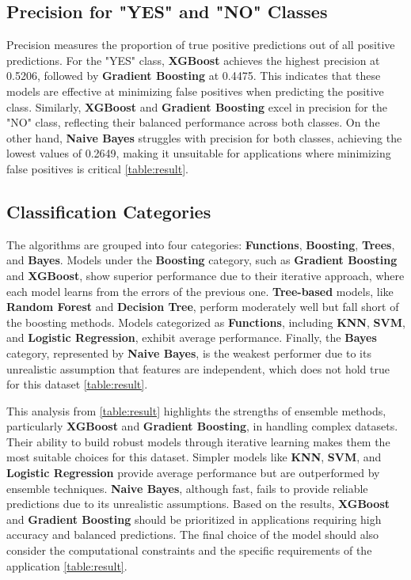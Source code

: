 \documentclass[pdflatex,sn-nature,Numbered]{sn-jnl}%
\theoremstyle{thmstyleone}%
\theoremstyle{thmstyletwo}%
\theoremstyle{thmstylethree}%
\begin{document}
\subsection{Precision for "YES" and "NO" Classes}
Precision measures the proportion of true positive predictions out of all positive predictions. For the "YES" class, \textbf{XGBoost} achieves the highest precision at 0.5206, followed by \textbf{Gradient Boosting} at 0.4475. This indicates that these models are effective at minimizing false positives when predicting the positive class. Similarly, \textbf{XGBoost} and \textbf{Gradient Boosting} excel in precision for the "NO" class, reflecting their balanced performance across both classes. On the other hand, \textbf{Naive Bayes} struggles with precision for both classes, achieving the lowest values of 0.2649, making it unsuitable for applications where minimizing false positives is critical \autoref{table:result}.

\subsection{Classification Categories}
The algorithms are grouped into four categories: \textbf{Functions}, \textbf{Boosting}, \textbf{Trees}, and \textbf{Bayes}. Models under the \textbf{Boosting} category, such as \textbf{Gradient Boosting} and \textbf{XGBoost}, show superior performance due to their iterative approach, where each model learns from the errors of the previous one. \textbf{Tree-based} models, like \textbf{Random Forest} and \textbf{Decision Tree}, perform moderately well but fall short of the boosting methods. Models categorized as \textbf{Functions}, including \textbf{KNN}, \textbf{SVM}, and \textbf{Logistic Regression}, exhibit average performance. Finally, the \textbf{Bayes} category, represented by \textbf{Naive Bayes}, is the weakest performer due to its unrealistic assumption that features are independent, which does not hold true for this dataset \autoref{table:result}.



This analysis from \autoref{table:result} highlights the strengths of ensemble methods, particularly \textbf{XGBoost} and \textbf{Gradient Boosting}, in handling complex datasets. Their ability to build robust models through iterative learning makes them the most suitable choices for this dataset. Simpler models like \textbf{KNN}, \textbf{SVM}, and \textbf{Logistic Regression} provide average performance but are outperformed by ensemble techniques. \textbf{Naive Bayes}, although fast, fails to provide reliable predictions due to its unrealistic assumptions. Based on the results, \textbf{XGBoost} and \textbf{Gradient Boosting} should be prioritized in applications requiring high accuracy and balanced predictions. The final choice of the model should also consider the computational constraints and the specific requirements of the application \autoref{table:result}.
\end{document}
